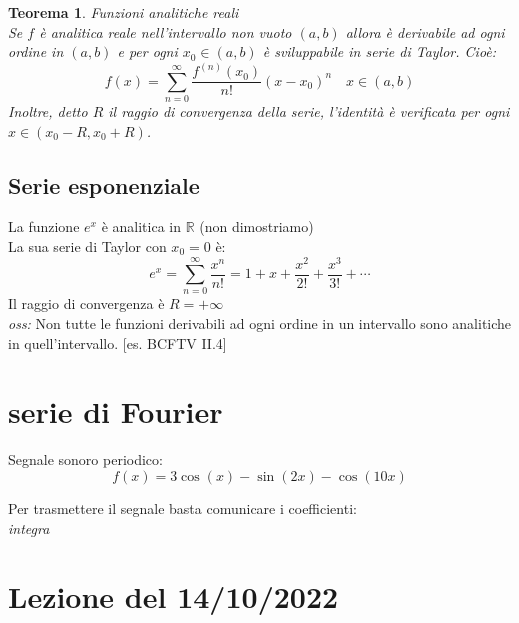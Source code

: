 \documentclass{scrreprt}
\newtheorem{teorema}{Teorema}
\newenvironment{thm}{\begin{mdframed}[backgroundcolor=Ivory2]\begin{teorema}}{\end{teorema}\end{mdframed}}
\begin{document}
\begin{thm}
	\emph{Funzioni analitiche reali}\\
	Se $f$ è analitica reale nell'intervallo non vuoto $(a,b)$ allora è derivabile ad ogni ordine in $(a,b)$ e per ogni $x_0\in (a,b)$ è sviluppabile in serie di Taylor. Cioè:
	\begin{equation}
		f(x) = \sum_{n=0}^\infty \frac{f^{(n)}(x_0)}{n!} \left(x-x_0\right)^n \quad x\in (a,b)
	\end{equation}
	Inoltre, detto $R$ il raggio di convergenza della serie, l'identità è verificata per ogni $x\in (x_0-R,x_0+R)$.
\end{thm}

\subsection*{Serie esponenziale}
La funzione $e^x$ è analitica in $\mathbb{R}$ (non dimostriamo)\\
La sua serie di Taylor con $x_0=0$ è:
\begin{equation}
	e^x = \sum_{n=0}^\infty \frac{x^n}{n!} = 1 + x + \frac{x^2}{2!} + \frac{x^3}{3!} + \cdots
\end{equation}
Il raggio di convergenza è $R=+\infty$\\


\emph{oss:} Non tutte le funzioni derivabili ad ogni ordine in un intervallo sono analitiche in quell'intervallo. [es. BCFTV II.4]

\newpage
\section{serie di Fourier}
Segnale sonoro periodico:
\begin{equation}
	f(x)=3\cos(x)-\sin(2x)-\cos(10x)
\end{equation}


Per trasmettere il segnale basta comunicare i coefficienti:\\

\emph{integra}
\section*{Lezione del 14/10/2022}
\end{document}
